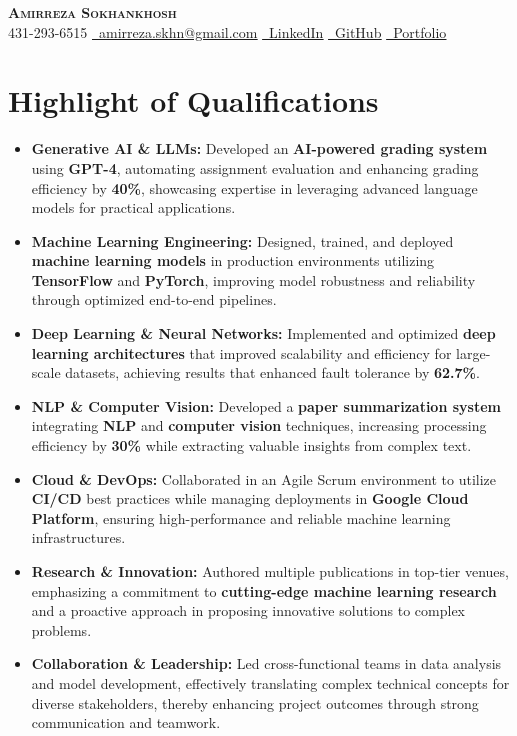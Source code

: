 \documentclass[letterpaper,11pt]{article}
\newcommand{\resumeItem}[1]{
  \item\small{
    #1 \vspace{0pt}
  }
}
\newcommand{\resumeItemListStart}{\begin{itemize}}
\newcommand{\resumeItemListEnd}{\end{itemize}\vspace{-5pt}}
\begin{document}


\begin{center}
    \textbf{\Huge \scshape Amirreza Sokhankhosh} \\ \vspace{1pt}
    \faPhone \small 431-293-6515 \quad
    \href{mailto:amirreza.skhn@gmail.com}{\faEnvelope \ \underline{amirreza.skhn@gmail.com}} \quad
    \href{https://www.linkedin.com/in/amirrezakh/}{\faLinkedin \ \underline{LinkedIn}} \quad
    \href{https://github.com/amirrezaskh}{\faGithub \ \underline{GitHub}} \quad
    \href{https://amirrezaskh.com}{\faBriefcase \ \underline{Portfolio}}
\end{center}

\section{Highlight of Qualifications}
\resumeItemListStart
\resumeItem{\textbf{Generative AI \& LLMs:} Developed an \textbf{AI-powered grading system} using \textbf{GPT-4}, automating assignment evaluation and enhancing grading efficiency by \textbf{40\%}, showcasing expertise in leveraging advanced language models for practical applications.}
\resumeItem{\textbf{Machine Learning Engineering:} Designed, trained, and deployed \textbf{machine learning models} in production environments utilizing \textbf{TensorFlow} and \textbf{PyTorch}, improving model robustness and reliability through optimized end-to-end pipelines.}
\resumeItem{\textbf{Deep Learning \& Neural Networks:} Implemented and optimized \textbf{deep learning architectures} that improved scalability and efficiency for large-scale datasets, achieving results that enhanced fault tolerance by \textbf{62.7\%}.}
\resumeItem{\textbf{NLP \& Computer Vision:} Developed a \textbf{paper summarization system} integrating \textbf{NLP} and \textbf{computer vision} techniques, increasing processing efficiency by \textbf{30\%} while extracting valuable insights from complex text.}
\resumeItem{\textbf{Cloud \& DevOps:} Collaborated in an Agile Scrum environment to utilize \textbf{CI/CD} best practices while managing deployments in \textbf{Google Cloud Platform}, ensuring high-performance and reliable machine learning infrastructures.}
\resumeItem{\textbf{Research \& Innovation:} Authored multiple publications in top-tier venues, emphasizing a commitment to \textbf{cutting-edge machine learning research} and a proactive approach in proposing innovative solutions to complex problems.}
\resumeItem{\textbf{Collaboration \& Leadership:} Led cross-functional teams in data analysis and model development, effectively translating complex technical concepts for diverse stakeholders, thereby enhancing project outcomes through strong communication and teamwork.}
\resumeItemListEnd
\end{document}
